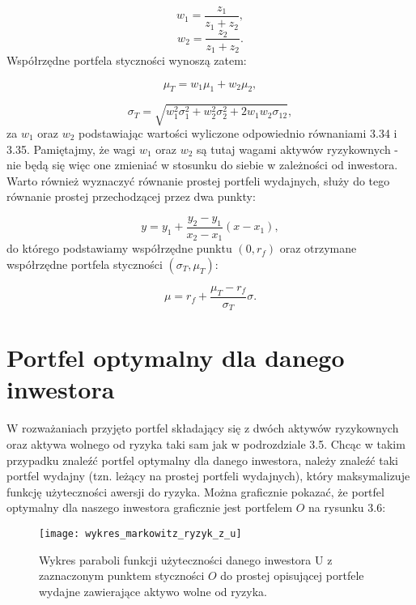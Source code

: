 \documentclass[magister]{dyplom}
\begin{document}
\begin{equation}
	w_1 = \frac{z_1}{z_1 + z_2},
\end{equation}
\begin{equation}
	w_2 = \frac{z_2}{z_1 + z_2}.
\end{equation}
Współrzędne portfela styczności wynoszą zatem:

\begin{equation}
	\mu_T = w_1\mu_1 + w_2\mu_2,
\end{equation}

\begin{equation}
	\sigma_T = \sqrt{w_1^{2}\sigma_1^{2} + w_2^{2}\sigma_2^{2} + 2w_1w_2\sigma_{12}},
\end{equation}
za $w_1$ oraz $w_2$ podstawiając wartości wyliczone odpowiednio równaniami 3.34 i 3.35\cite{book}. Pamiętajmy, że wagi $w_1$ oraz $w_2$ są tutaj wagami aktywów ryzykownych - nie będą się więc one zmieniać w stosunku do siebie w zależności od inwestora.\\

Warto również wyznaczyć równanie prostej portfeli wydajnych, służy do tego równanie prostej przechodzącej przez dwa punkty:

\begin{equation}
	y = y_1 + \frac{y_2 - y_1}{x_2 - x_1}(x - x_1),
\end{equation}
do którego podstawiamy współrzędne punktu $(0, r_f)$ oraz otrzymane współrzędne portfela styczności $(\sigma_T, \mu_T)$:

\begin{equation}
	\mu = r_f + \frac{\mu_T - r_f}{\sigma_T}\sigma.
\end{equation}

\section{Portfel optymalny dla danego inwestora}
W rozważaniach przyjęto portfel składający się z dwóch aktywów ryzykownych oraz aktywa wolnego od ryzyka taki sam jak w podrozdziale 3.5. Chcąc w takim przypadku znaleźć portfel optymalny dla danego inwestora, należy znaleźć taki portfel wydajny (tzn. leżący na prostej portfeli wydajnych), który maksymalizuje funkcję użyteczności awersji do ryzyka. Można graficznie pokazać, że portfel optymalny dla naszego inwestora graficznie jest portfelem $O$ na rysunku 3.6:\\
\newpage
\begin{figure}[h]
	\centering
	\texttt{[image: wykres\_markowitz\_ryzyk\_z\_u]}
	\caption{Wykres paraboli funkcji użyteczności danego inwestora U z zaznaczonym punktem styczności $O$ do prostej opisującej portfele wydajne zawierające aktywo wolne od ryzyka.}
\end{figure}
\end{document}

